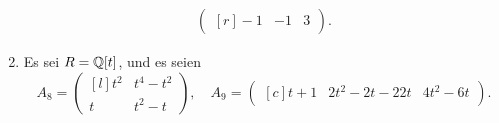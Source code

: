 \begin{question}[subtitle = Smith-Normalform Und Kokerne]
\begin{enumerate}
\begin{gather*}
\begin{pmatrix*}[r]
           -1 & -1  & 3
        \end{pmatrix*}.
      \end{gather*}
    \item
      Es sei $R = \mathbb{Q}[t]$, und es seien
      \[
        A_8 =
        \begin{pmatrix*}[l]
          t^2 & t^4 - t^2 \\
          t   & t^2 - t
        \end{pmatrix*},
        \quad
        A_9 =
        \begin{pmatrix*}[c]
            t + 1 & 2 t^2 - 2 t - 2
          2 t     & 4 t^2 - 6 t
        \end{pmatrix*}.
      \]
  \end{enumerate}
\end{question}


